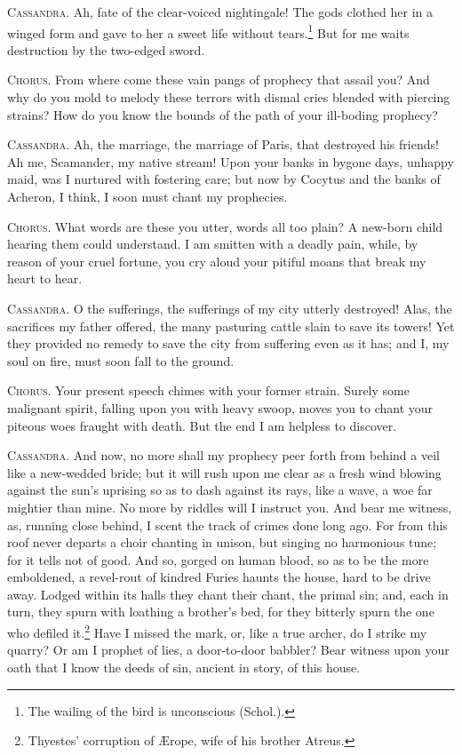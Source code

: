 \documentclass[12pt]{article}
\begin{document}
\textsc{Cassandra.} Ah, fate of the clear-voiced nightingale! The gods clothed her in a winged form and gave to her a sweet life without tears.\footnote{The wailing of the bird is unconscious (Schol.).} But for me waits destruction by the two-edged sword.

\textsc{Chorus.} From where come these vain pangs of prophecy that assail you? And why do you mold to melody these terrors with dismal cries blended with piercing strains? How do you know the bounds of the path of your ill-boding prophecy?

\textsc{Cassandra.} Ah, the marriage, the marriage of Paris, that destroyed his friends! Ah me, Scamander, my native stream! Upon your banks in bygone days, unhappy maid, was I nurtured with fostering care; but now by Cocytus and the banks of Acheron, I think, I soon must chant my prophecies.

\textsc{Chorus.} What words are these you utter, words all too plain? A new-born child hearing them could understand. I am smitten with a deadly pain, while, by reason of your cruel fortune, you cry aloud your pitiful moans that break my heart to hear.

\textsc{Cassandra.} O the sufferings, the sufferings of my city utterly destroyed! Alas, the sacrifices my father offered, the many pasturing cattle slain to save its towers! Yet they provided no remedy to save the city from suffering even as it has; and I, my soul on fire, must soon fall to the ground.

\textsc{Chorus.} Your present speech chimes with your former strain. Surely some malignant spirit, falling upon you with heavy swoop, moves you to chant your piteous woes fraught with death. But the end I am helpless to discover.

\textsc{Cassandra.} And now, no more shall my prophecy peer forth from behind a veil like a new-wedded bride; but it will rush upon me clear as a fresh wind blowing against the sun's uprising so as to dash against its rays, like a wave, a woe far mightier than mine. No more by riddles will I instruct you. And bear me witness, as, running close behind, I scent the track of crimes done long ago. For from this roof never departs a choir chanting in unison, but singing no harmonious tune; for it tells not of good. And so, gorged on human blood, so as to be the more emboldened, a revel-rout of kindred Furies haunts the house, hard to be drive away. Lodged within its halls they chant their chant, the primal sin; and, each in turn, they spurn with loathing a brother's bed, for they bitterly spurn the one who defiled it.\footnote{Thyestes' corruption of {\AE}rope, wife of his brother Atreus.} Have I missed the mark, or, like a true archer, do I strike my quarry? Or am I prophet of lies, a door-to-door babbler? Bear witness upon your oath that I know the deeds of sin, ancient in story, of this house.
\end{document}
